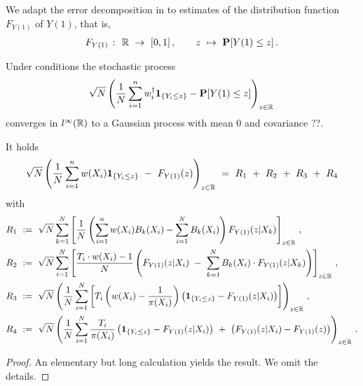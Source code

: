 We adapt the error decomposition in \cite[page 27]{Wang2019} 
to estimates of the distribution function $F_{Y(1)}$ of $Y(1)$, 
that is,
\begin{gather}
  F_{Y(1)}
  \ 
  \colon
  \ 
  \R
  \ 
  \to
  \ 
  [0,1]
  \, 
  , 
  \qquad
  z
  \ 
  \mapsto
  \ 
  \P
  [
  Y(1)
  \le
  z
  ]
  \,.
\end{gather}
\begin{ftheorem}
  \label{aa:mean:th}
  Under conditions 
the stochastic process
\begin{gather}
    \sqrt{N}
    \left( 
  \frac{1}{N}
    \sum_{i=1}^{n} 
    w_i^\dagger
    \mathbf{1}
    _{\left\{ Y_i\le z \right\}}
    -
    \mathbf{P}[Y(1)\le z]
    \right)
    _{z\in\mathbb{R}}
    \,
  \end{gather}
  converges in
  $l^\infty(\mathbb{R})$
  to a Gaussian process with mean 0 and covariance ??.
\end{ftheorem}

\begin{lemma}
  \label{aa:mean:lemma_decomp}
  It holds
  \begin{gather}
  \sqrt{N}
\left( 
    \frac{1}{N}
    \sum_{i=1}^{n} 
    w(X_i)
    \mathbf{1}_{\left\{ Y_i \le z \right\}}
    \ 
    -
    \ 
    F_{Y(1)}(z)
    \right)
    _{z\in\R}
    \ 
    =
    \ 
    R_1
    \ 
    +
    \ 
    R_2
    \ 
    +
    \ 
    R_3
    \ 
    +
    \ 
    R_4
  \end{gather}
  with
\begin{align*}
  R_1
  &
  \ 
  :=
  \ 
  \sqrt{N}
  \sum_{k=1}^{N} 
  \left[ 
  \frac{1}{N}
  \left( 
    \sum_{i=1}^{n} 
    w(X_i)
    B_k(X_i)
    -
    \sum_{i=1}^{N} 
    B_k(X_i)
  \right)
  F_{Y(1)}(z|X_k)
  \right]
  _{z\in\R}
  \,,
  \\
  R_2
  &
  \
  :=
  \ 
  \sqrt{N}
    \sum_{i=1}^{N} 
    \left[ 
  \frac{
    T_i\cdot w(X_i) -1 }{N}
    \left( 
  F_{Y(1)}(z|X_i)
    \ 
    -
    \ 
    \sum_{k=1}^{N} 
    B_k(X_i)
    \cdot
  F_{Y(1)}(z|X_k)
    \right)
    \right]
  _{z\in\R}
  \,,
  \\
  R_3
  &
  \
  :=
  \ 
  \sqrt{N}
  \left( 
  \frac{1}{N}
    \sum_{i=1}^{N} 
    \left[ 
    T_i
    \left( 
    w(X_i) 
    -
    \frac{1}{\pi(X_i)}
    \right)
    \left( 
    \mathbf{1}_{\left\{ Y_i \le z \right\}}
    -
  F_{Y(1)}(z|X_i)
    \right)
    \right]
  \right)
  _{z\in\R}
  \,,
  \\
  R_4
  &
  \
  :=
  \ 
  \sqrt{N}
  \left( 
  \frac{1}{N}
    \sum_{i=1}^{N} 
    \frac{T_i}{\pi(X_i)}
    \left( 
    \mathbf{1}_{\left\{ Y_i \le z \right\}}
    -
  F_{Y(1)}(z|X_i)
    \right)
    \ 
    +
    \ 
    \left( 
  F_{Y(1)}(z|X_i)
    -
  F_{Y(1)}(z)
    \right)
  \right)
  _{z\in\R}
  \,.
  \end{align*}

\end{lemma}
\begin{proof}
  An elementary but long calculation yields the result. We omit the details.
\end{proof}

